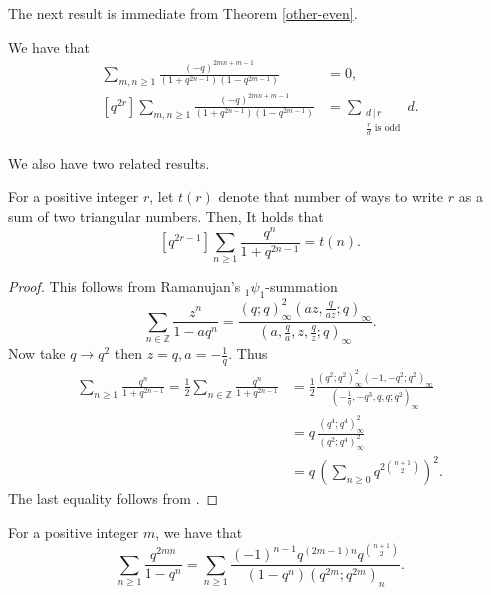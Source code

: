 \documentclass[a4paper,reqno,12pt]{amsart}
\begin{document}
\smallskip
\noindent
The next result is immediate from Theorem \ref{other-even}.

\begin{corollary} We have that
\begin{align*} 
[q^{2r-1}]\sum_{m,n \geq1} \frac{(-q)^{2mn+m-1}}{(1+q^{2n-1})(1-q^{2m-1})}&=0, \\
[q^{2r}]\sum_{m,n \geq1} \frac{(-q)^{2mn+m-1}}{(1+q^{2n-1})(1-q^{2m-1})}
&=\sum_{\substack{d\, \vert \, r \\ \text{$\frac{r}d$  is odd}}} d.
\end{align*}
\end{corollary}


We also have two related results. 
\begin{proposition} \label{kick1} For a positive integer $r$, let $t(r)$ denote that number of ways to write $r$ as a sum of two triangular numbers. Then,  It holds that
$$[q^{2r-1}] \sum_{n\geq1} \frac{q^n}{1+q^{2n-1}}
=t(n).$$
\end{proposition}

\begin{proof} This follows from  Ramanujan's ${}_1\psi_1$-summation 
$$\sum_{n\in\mathbb{Z}} \frac{z^n}{1-aq^n}
= \frac{(q;q)^2_{\infty} (az, \frac{q}{az}; q)_{\infty}} {(a,\frac{q}a,z, \frac{q}z; q)_{\infty}}.$$
Now take $q\rightarrow q^2$ then $z=q, a=-\frac1q$.  Thus
\begin{align*} \sum_{n\geq1} \frac{q^n}{1+q^{2n-1}} = \frac12 \sum_{n\in\mathbb{Z}} \frac{q^n}{1+q^{2n-1}} 
 & = \frac12 \frac{(q^2;q^2)^2_{\infty} (-1,-q^2;q^2)_{\infty}}{(-\frac1q, -q^3, q, q;q^2)_{\infty}}  \\
&= q\, \frac{(q^4;q^4)_{\infty}^2}{(q^2;q^4)_{\infty}^2}  \\
& = q\, \left(\sum_{n\geq0} q^{2\binom{n+1}2}\right)^2.
\end{align*}
The last equality follows from \cite[ eq'n (31.2)]{F}. 
\end{proof}


\begin{proposition} \label{kick2} For a positive integer $m$, we have that
$$\sum_{n\geq1} \frac{q^{2mn}}{1-q^n}
=\sum_{n\geq1} \frac{(-1)^{n-1}q^{(2m-1)n}q^{\binom{n+1}2}}{(1-q^n)(q^{2m};q^{2m})_n}.$$
\end{proposition}
\end{document}
